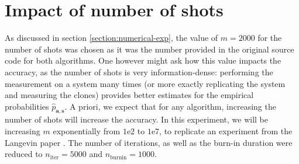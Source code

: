 \documentclass[12pt]{memoir}
\newcommand{\mb}{\mathbf}
\newcommand{\nitern}[1]{$n_{\text{iter}}=#1$}
\newcommand{\nburninn}[1]{$n_{\text{burnin}}=#1$}
\begin{document}
\section{Impact of number of shots}\label{section:comp-nb-shots}

As discussed in section \ref{section:numerical-exp}, the value of $m=2000$ for the number of shots was chosen as it was the number provided in the original source code for both algorithms. One however might ask how this value impacts the accuracy, as the number of shots is very information-dense: performing the measurement on a system many times (or more exactly replicating the system and measuring the clones) provides better estimates for the empirical probabilities $\hat p_{\mb a, \mb s}$. A priori, we expect that for any algorithm, increasing the number of shots will increase the accuracy. In this experiment, we will be increasing $m$ exponentially from $1\text{e}2$ to $1\text{e}7$, to replicate an experiment from the Langevin paper \cite{meth:bayesian:Langevin:ACMT2024}. The number of iterations, as well as the burn-in duration were reduced to \nitern{5000} and \nburninn{1000}.
\end{document}
